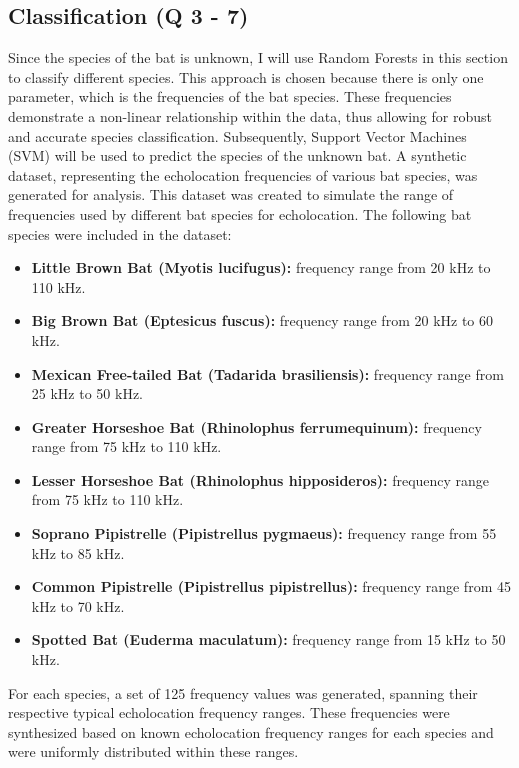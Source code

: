 \documentclass[twocolumn]{article}[ht]
\begin{document}
\subsection{Classification (Q 3 - 7)}
Since the species of the bat is unknown, I will use Random Forests in this section to classify different species. This approach is chosen because there is only one parameter, which is the frequencies of the bat species. These frequencies demonstrate a non-linear relationship within the data, thus allowing for robust and accurate species classification. Subsequently, Support Vector Machines (SVM) will be used to predict the species of the unknown bat. A synthetic dataset, representing the echolocation frequencies of various bat species, was generated for analysis. This dataset was created to simulate the range of frequencies used by different bat species for echolocation. The following bat species were included in the dataset:
\begin{itemize}
    \item \textbf{Little Brown Bat (Myotis lucifugus):} frequency range from 20 kHz to 110 kHz.

    \item \textbf{Big Brown Bat (Eptesicus fuscus):} frequency range from 20 kHz to 60 kHz.

    \item \textbf{Mexican Free-tailed Bat (Tadarida brasiliensis):} frequency range from 25 kHz to 50 kHz.

    \item \textbf{Greater Horseshoe Bat (Rhinolophus ferrumequinum):} frequency range from 75 kHz to 110 kHz.

    \item \textbf{Lesser Horseshoe Bat (Rhinolophus hipposideros):} frequency range from 75 kHz to 110 kHz.

    \item \textbf{Soprano Pipistrelle (Pipistrellus pygmaeus):} frequency range from 55 kHz to 85 kHz.

    \item \textbf{Common Pipistrelle (Pipistrellus pipistrellus):} frequency range from 45 kHz to 70 kHz.

    \item \textbf{Spotted Bat (Euderma maculatum):} frequency range from 15 kHz to 50 kHz.
\end{itemize}


For each species, a set of 125 frequency values was generated, spanning their respective typical echolocation frequency ranges. These frequencies were synthesized based on known echolocation frequency ranges for each species and were uniformly distributed within these ranges.
\end{document}
